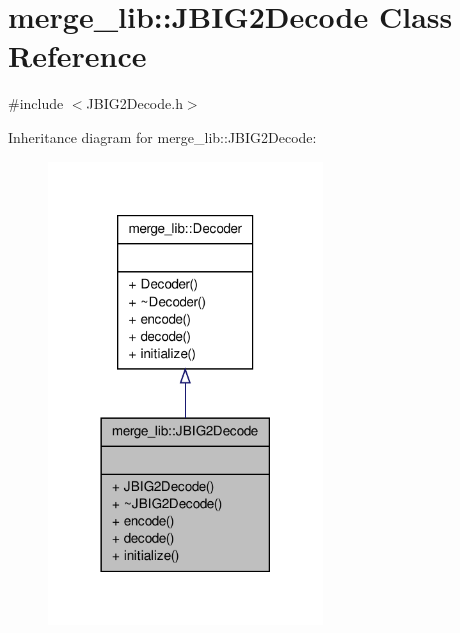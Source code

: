\hypertarget{classmerge__lib_1_1_j_b_i_g2_decode}{\section{merge\-\_\-lib\-:\-:J\-B\-I\-G2\-Decode Class Reference}
\label{dc/d23/classmerge__lib_1_1_j_b_i_g2_decode}
}


{\ttfamily \#include $<$J\-B\-I\-G2\-Decode.\-h$>$}



Inheritance diagram for merge\-\_\-lib\-:\-:J\-B\-I\-G2\-Decode\-:
\nopagebreak
\begin{figure}[H]
\begin{center}
\leavevmode
\includegraphics[width=206pt]{d0/d6c/classmerge__lib_1_1_j_b_i_g2_decode__inherit__graph}
\end{center}
\end{figure}


